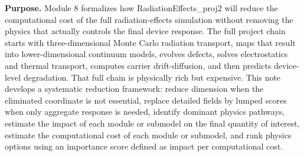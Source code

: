 \documentclass[11pt]{article}
\begin{document}

\begin{overviewbox}
\textbf{Purpose.} Module 8 formalizes how RadiationEffects\_proj2 will reduce the computational cost of the full radiation-effects simulation without removing the physics that actually controls the final device response. The full project chain starts with three-dimensional Monte Carlo radiation transport, maps that result into lower-dimensional continuum models, evolves defects, solves electrostatics and thermal transport, computes carrier drift-diffusion, and then predicts device-level degradation. That full chain is physically rich but expensive. This note develops a systematic reduction framework: reduce dimension when the eliminated coordinate is not essential, replace detailed fields by lumped scores when only aggregate response is needed, identify dominant physics pathways, estimate the impact of each module or submodel on the final quantity of interest, estimate the computational cost of each module or submodel, and rank physics options using an importance score defined as impact per computational cost.
\end{overviewbox}

\ProjectTOC
\end{document}
